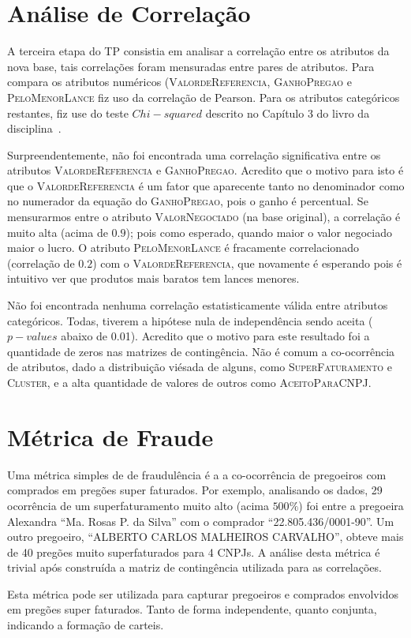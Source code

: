 \documentclass[brazil,a4paper,12pt]{article}
\begin{document}
\section{Análise de Correlação}

A terceira etapa do TP consistia em analisar a correlação entre os atributos da nova base, tais correlações foram mensuradas entre pares de atributos. Para compara os atributos numéricos (\textsc{ValordeReferencia}, \textsc{GanhoPregao} e \textsc{PeloMenorLance} fiz uso da correlação de Pearson. Para os atributos categóricos restantes, fiz use do teste $Chi-squared$ descrito no Capítulo 3 do livro da disciplina~\cite{meira}. 

Surpreendentemente, não foi encontrada uma correlação significativa entre os atributos \textsc{ValordeReferencia} e \textsc{GanhoPregao}. Acredito que o motivo para isto é que o \textsc{ValordeReferencia} é um fator que aparecente tanto no denominador como no numerador da equação do \textsc{GanhoPregao}, pois o ganho é percentual. Se mensurarmos entre o atributo \textsc{ValorNegociado} (na base original), a correlação é muito alta (acima de $0.9$); pois como esperado, quando maior o valor negociado maior o lucro. O atributo \textsc{PeloMenorLance} é fracamente correlacionado (correlação de $0.2$) com o \textsc{ValordeReferencia}, que novamente é esperando pois é intuitivo ver que produtos mais baratos tem lances menores.

Não foi encontrada nenhuma correlação estatisticamente válida entre atributos categóricos. Todas, tiverem a hipótese nula de independência sendo aceita ($p-values$ abaixo de 0.01). Acredito que o motivo para este resultado foi a quantidade de zeros nas matrizes de contingência. Não é comum a co-ocorrência de atributos, dado a distribuição viésada de alguns, como \textsc{SuperFaturamento} e \textsc{Cluster}, e a alta quantidade de valores de outros como \textsc{AceitoParaCNPJ}.

\section{Métrica de Fraude}

Uma métrica simples de de fraudulência é a a co-ocorrência de pregoeiros com comprados em pregões super faturados. Por exemplo, analisando os dados, 29 ocorrência de um superfaturamento muito alto (acima $500\%$) foi entre a pregoeira Alexandra ``Ma. Rosas P. da Silva'' com o comprador ``22.805.436/0001-90''. Um outro pregoeiro, ``ALBERTO CARLOS MALHEIROS CARVALHO'', obteve mais de 40 pregões muito superfaturados para 4 CNPJs. A análise desta métrica é trivial após construída a matriz de contingência utilizada para as correlações.

Esta métrica pode ser utilizada para capturar pregoeiros e comprados envolvidos em pregões super faturados. Tanto de forma independente, quanto conjunta, indicando a formação de carteis.



\end{document}
